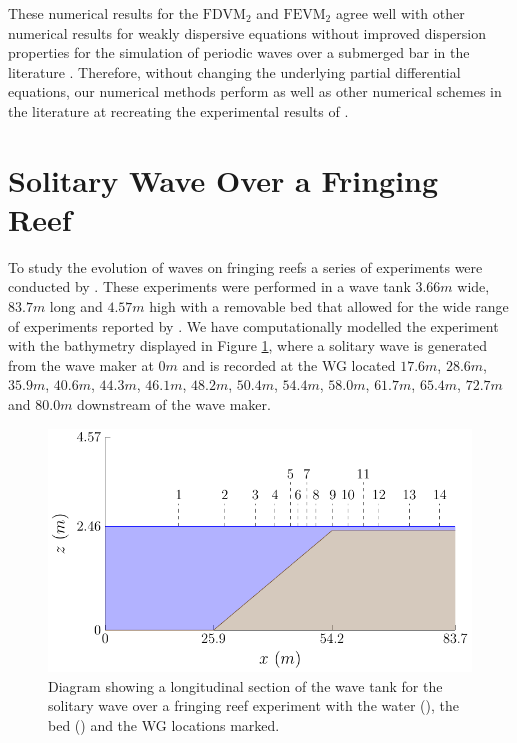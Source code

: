 These numerical results for the $\text{FDVM}_2$ and $\text{FEVM}_2$ agree well with other numerical results for weakly dispersive equations without improved dispersion properties for the simulation of periodic waves over a submerged bar in the literature \cite{Beji-Battjes-1994-1,Lannes-2013,Li-2014-169,Zhang-2013-13}. Therefore, without changing the underlying partial differential equations, our numerical methods perform as well as other numerical schemes in the literature at recreating the experimental results of \citet{Beji-Battjes-1994-1}.

\section{Solitary Wave Over a Fringing Reef}
To study the evolution of waves on fringing reefs a series of experiments were conducted by \citet{Roeber-2010}. These experiments were performed in a wave tank $3.66m$ wide, $83.7m$ long and $4.57m$ high with a removable bed that allowed for the wide range of experiments reported by \citet{Roeber-2010}. We have computationally modelled the experiment with the bathymetry displayed in Figure \ref{fig:RoeberWT}, where a solitary wave is generated from the wave maker at $0m$ and is recorded at the WG located $17.6m$, $28.6m$, $35.9m$, $40.6m$, $44.3m$, $46.1m$, $48.2m$, $50.4m$, $54.4m$, $58.0m$, $61.7m$, $65.4m$, $72.7m$ and $80.0m$ downstream of the wave maker.
\begin{figure}
	\centering
	\includegraphics[width=\textwidth]{./chp6/figures/Experiment/Roeber/Trial8/WaveTank.pdf}
	\caption{Diagram showing a longitudinal section of the wave tank for the solitary wave over a fringing reef experiment with the water (), the bed () and the WG locations marked.}
	\label{fig:RoeberWT}
\end{figure}

